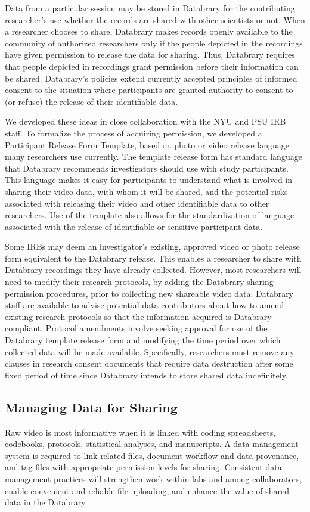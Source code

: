 \documentclass[letterpaper,man,natbib]{apa6}
\begin{document}
Data from a particular session may be stored in Databrary for the contributing researcher’s use whether the records are shared with other scientists or not. 
When a researcher chooses to share, Databrary makes records openly available to the community of authorized researchers only if the people depicted in the recordings have given permission to release the data for sharing. 
Thus, Databrary requires that people depicted in recordings grant permission before their information can be
shared.
Databrary’s policies extend currently accepted principles of informed consent to the situation where participants are granted authority to consent to (or refuse) the release of their identifiable data.

We developed these ideas in close collaboration with the NYU and PSU IRB staff. 
To formalize the process of acquiring permission, we developed a Participant Release Form Template, based on photo or video release language many researchers use currently. 
The template release form has standard language that Databrary recommends investigators should use
with study participants. 
This language makes it easy for participants to understand what is involved in sharing their video data, with whom it will be shared, and the potential risks associated with releasing their video and other identifiable data to other researchers. 
Use of the template also allows for the standardization of language associated with the release of identifiable or sensitive participant data.

Some IRBs may deem an investigator’s existing, approved video or photo release form equivalent to the Databrary release. 
This enables a researcher to share with Databrary recordings they have already
collected. 
However, most researchers will need to modify their research protocols, by adding the Databrary sharing permission procedures, prior to collecting new shareable video data. 
Databrary staff are available to advise potential data contributors about how to amend existing research
protocols so that the information acquired is Databrary-compliant.
Protocol amendments involve seeking approval for use of the Databrary
template release form and modifying the time period over which collected
data will be made available. 
Specifically, researchers must remove any clauses in research consent documents that require data destruction
after some fixed period of time since Databrary intends to store shared
data indefinitely.
\subsection{Managing Data for Sharing}
Raw video is most informative when it is linked with coding spreadsheets, codebooks, protocols, statistical analyses, and manuscripts. 
A data management system is required to link related files, document workflow and data provenance, and tag files with appropriate permission levels for sharing. 
Consistent data management practices will strengthen work within labs and among collaborators, enable convenient and reliable file uploading, and enhance the value of shared data in the Databrary.
\end{document}
